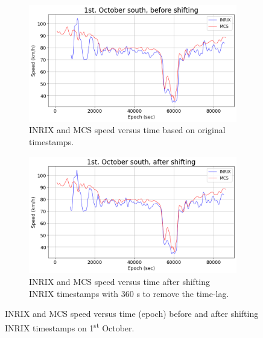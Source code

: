 \documentclass[english]{kththesis}
\begin{document}
\begin{figure}[!ht]
    \centering
    \begin{subfigure}{0.7\textwidth}
        \centering
        \includegraphics[width=\textwidth]{before_shifting.png}
        \caption{INRIX and MCS speed versus time based on original timestamps.}
        \label{subfig:before_shifting}
    \end{subfigure}
    \hfill
    \begin{subfigure}{0.7\textwidth}
        \centering
        \includegraphics[width=\textwidth]{after_shifting.png}
        \caption{INRIX and MCS speed versus time after shifting INRIX timestamps with 360 s to remove the time-lag.}
        \label{subfig:after_shifting}
    \end{subfigure}
    \caption{INRIX and MCS speed versus time (epoch) before and after shifting INRIX timestamps on 1\textsuperscript{st} October.}
    \label{fig:shifting}
\end{figure}
\end{document}

